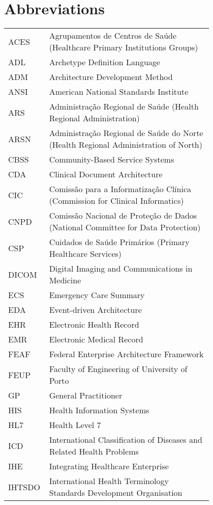 \chapter*{Abbreviations}

\begin{flushleft}
\begin{tabular}{l p{0.8\linewidth}}
ACES	& Agrupamentos de Centros de Saúde (Healthcare Primary Institutions Groups) \\
ADL		& Archetype Definition Language \\
ADM		& Architecture Development Method \\
ANSI	& American National Standards Institute \\
ARS		& Administração Regional de Saúde (Health Regional Administration) \\
ARSN	& Administração Regional de Saúde do Norte (Health Regional Administration of North) \\
CBSS	& Community-Based Service Systems \\
CDA		& Clinical Document Architecture \\
CIC		& Comissão para a Informatização Clínica (Commission for Clinical Informatics) \\
CNPD	& Comissão Nacional de Proteção de Dados (National Committee for Data Protection) \\
CSP		& Cuidados de Saúde Primários (Primary Healthcare Services) \\
DICOM	& Digital Imaging and Communications in Medicine \\
ECS		& Emergency Care Summary \\
EDA		& Event-driven Architecture \\
EHR		& Electronic Health Record \\
EMR		& Electronic Medical Record \\
FEAF	& Federal Enterprise Architecture Framework \\
FEUP	& Faculty of Engineering of University of Porto \\
GP		& General Practitioner \\
HIS		& Health Information Systems \\
HL7		& Health Level 7 \\
ICD		& International Classification of Diseases and Related Health Problems \\
IHE		& Integrating Healthcare Enterprise \\
IHTSDO  & International Health Terminology Standards Development Organisation \\

\end{tabular}
\end{flushleft}
